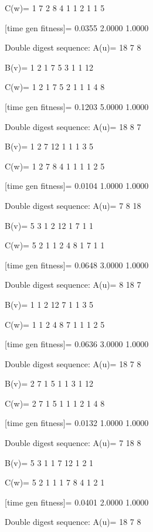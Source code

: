 C(w)=
     1     7     2     8     4     1     1     2     1     1     5

[time gen fitness]=
    0.0355    2.0000    1.0000

Double digest sequence:
A(u)=
    18     7     8

B(v)=
     1     2     1     7     5     3     1     1    12

C(w)=
     1     2     1     7     5     2     1     1     1     4     8

[time gen fitness]=
    0.1203    5.0000    1.0000

Double digest sequence:
A(u)=
    18     8     7

B(v)=
     1     2     7    12     1     1     1     3     5

C(w)=
     1     2     7     8     4     1     1     1     1     2     5

[time gen fitness]=
    0.0104    1.0000    1.0000

Double digest sequence:
A(u)=
     7     8    18

B(v)=
     5     3     1     2    12     1     7     1     1

C(w)=
     5     2     1     1     2     4     8     1     7     1     1

[time gen fitness]=
    0.0648    3.0000    1.0000

Double digest sequence:
A(u)=
     8    18     7

B(v)=
     1     1     2    12     7     1     1     3     5

C(w)=
     1     1     2     4     8     7     1     1     1     2     5

[time gen fitness]=
    0.0636    3.0000    1.0000

Double digest sequence:
A(u)=
    18     7     8

B(v)=
     2     7     1     5     1     1     3     1    12

C(w)=
     2     7     1     5     1     1     1     2     1     4     8

[time gen fitness]=
    0.0132    1.0000    1.0000

Double digest sequence:
A(u)=
     7    18     8

B(v)=
     5     3     1     1     7    12     1     2     1

C(w)=
     5     2     1     1     1     7     8     4     1     2     1

[time gen fitness]=
    0.0401    2.0000    1.0000

Double digest sequence:
A(u)=
    18     7     8

